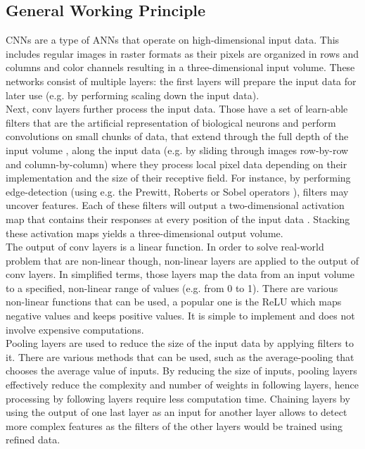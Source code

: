 \subsection{General Working Principle}
\acp{CNN} are a type of \acp{ANN} that operate on high-dimensional input data. This includes regular images in raster formats as their pixels are organized in rows and columns and color channels resulting in a three-dimensional input volume. These networks consist of multiple layers: the first layers will prepare the input data for later use (e.g. by performing scaling down the input data).\\
Next, \ac{conv} layers further process the input data. Those have a set of learn-able filters that are the artificial representation of biological neurons and perform convolutions on small chunks of data, that extend through the full depth of the input volume \cite{Schweitzer2017}, along the input data (e.g. by sliding through images row-by-row and column-by-column) where they process local pixel data depending on their implementation and the size of their receptive field. For instance, by performing edge-detection (using e.g. the Prewitt, Roberts or Sobel operators \cite{5557884}), filters may uncover features. Each of these filters will output a two-dimensional activation map that contains their responses at every position of the input data \cite{cs231n}. Stacking these activation maps yields a three-dimensional output volume.\\
The output of \ac{conv} layers is a linear function. In order to solve real-world problem that are non-linear though, non-linear layers are applied to the output of \ac{conv} layers. In simplified terms, those layers map the data from an input volume to a specified, non-linear range of values (e.g. from 0 to 1). There are various non-linear functions that can be used, a popular one is the \ac{ReLU} which maps negative values and keeps positive values. It is simple to implement and does not involve expensive computations.\\ %
Pooling layers are used to reduce the size of the input data by applying filters to it. There are various methods that can be used, such as the average-pooling that chooses the average value of inputs. By reducing the size of inputs, pooling layers effectively reduce the complexity and number of weights in following layers, hence processing by following layers require less computation time. Chaining layers by using the output of one last layer as an input for another layer allows to detect more complex features as the filters of the other layers would be trained using refined data.\\
